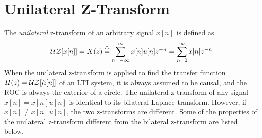 
\section*{Unilateral Z-Transform}

The {\em unilateral} z-transform of an arbitrary signal $x[n]$ is defined as
\[	{\cal UZ}[x[n]]=X(z)\stackrel{\triangle}{=}
\sum_{n=-\infty}^\infty x[n]u[n] z^{-n}=\sum_{n=0}^\infty x[n] z^{-n}
\]
When the unilateral z-transform is applied to find the transfer function 
$H(z)={\cal UZ}[h[n]]$ of an LTI system, it is always assumed to be causal, 
and the ROC is always the exterior of a circle. The unilateral z-transform
of any signal $x[n]=x[n]u[n]$ is identical to its bilateral Laplace transform.
However, if $x[n] \ne x[n]u[n]$, the two z-transforms are different. Some of 
the properties of the unilateral z-transform different from the bilateral 
z-transform are listed below.


